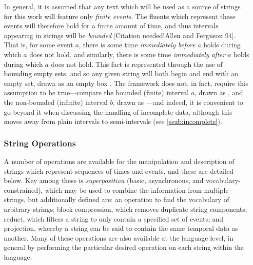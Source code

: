 \documentclass[a4paper,12pt,leqno]{article}
\newcommand{\vph}[1]{\vphantom{#1}}
\newcommand{\ebox}[1]{\fbox{$\vph{'(),}#1$}}
\newcommand{\EventString}[1]{%
	\renewcommand*{\do}[1]{\ebox{##1}}%
	\PipeParser{#1}%
}
\newcommand{\citeneeded}[1][]{{\color{red}[Citation needed!#1]}}
\begin{document}
In general, it is assumed that any text which will be used as a source of strings for this work will feature only \textit{finite events}. The fluents which represent these events will therefore hold for a finite amount of time, and thus intervals appearing in strings will be \textit{bounded} \citeneeded[Allen and Ferguson 94]{}. That is, for some event $a$, there is some time \textit{immediately before} $a$ holds during which $a$ does not hold, and similarly, there is some time \textit{immediately after} $a$ holds during which $a$ does not hold. This fact is represented through the use of bounding empty sets, and so any given string will both begin and end with an empty set, drawn as an empty box \ebox{}. The framework does not, in fact, require this assumption to be true---compare the bounded (finite) interval $a$, drawn as \EventString{{}|a|{}}, and the non-bounded (infinite) interval $b$, drawn as \EventString{b}---and indeed, it is convenient to go beyond it when discussing the handling of incomplete data, although this moves away from plain intervals to semi-intervals (see \cref{ssub:incomplete}).

\subsubsection{String Operations}\label{ssub:operations}
A number of operations are available for the manipulation and description of strings which represent sequences of times and events, and these are detailed below. Key among these is \textit{superposition} (basic, asynchronous, and vocabulary-constrained), which may be used to combine the information from multiple strings, but additionally defined are: an operation to find the vocabulary of arbitrary strings; block compression, which removes duplicate string components; reduct, which filters a string to only contain a specified set of events; and projection, whereby a string can be said to contain the same temporal data as another. Many of these operations are also available at the language level, in general by performing the particular desired operation on each string within the language.
\end{document}
